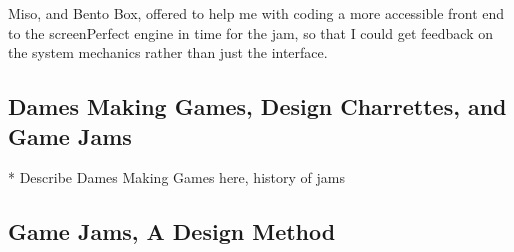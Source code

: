 Miso, and Bento Box, offered to help me with coding a more accessible front end to the screenPerfect engine in time for the jam, so that I could get feedback on the system mechanics rather than just the interface.

\subsection{Dames Making Games, Design Charrettes, and Game Jams}


* Describe Dames Making Games here, history of jams



\subsection{Game Jams, A Design Method}

